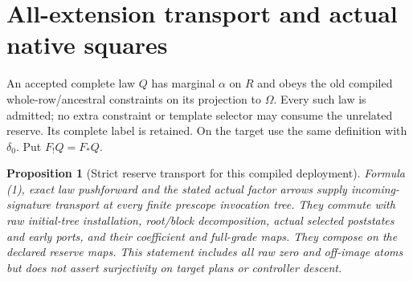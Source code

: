 \documentclass[11pt]{article}
\newtheorem{proposition}{Proposition}
\begin{document}
\section{All-extension transport and actual native squares}
An accepted complete law $Q$ has marginal $\alpha$ on $R$ and obeys the old compiled whole-row/ancestral constraints on its projection to $\Omega$. Every such law is admitted; no extra constraint or template selector may consume the unrelated reserve. Its complete label is retained. On the target use the same definition with $\delta_0$. Put $F_!Q=F_*Q$.

\begin{proposition}[Strict reserve transport for this compiled deployment]
Formula (1), exact law pushforward and the stated actual factor arrows supply incoming-signature transport at every finite prescope invocation tree. They commute with raw initial-tree installation, root/block decomposition, actual selected poststates and early ports, and their coefficient and full-grade maps. They compose on the declared reserve maps. This statement includes all raw zero and off-image atoms but does not assert surjectivity on target plans or controller descent.
\end{proposition}
\end{document}
